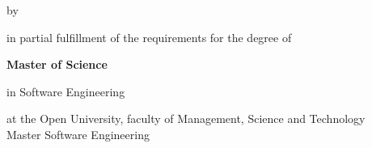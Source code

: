 \begin{titlepage}

    \begin{center}


        \vspace*{2\bigskipamount}

        {\makeatletter
            \titlestyle\color{red}\Huge\@title
            \makeatother}

        {\makeatletter
            \ifx\@subtitle\undefined\else
                \bigskip
                \titlefont\titleshape\LARGE\@subtitle
            \fi
            \makeatother}

        \bigskip
        \bigskip

        by

        \bigskip
        \bigskip

        {\makeatletter
            \titlefont\Large\bfseries\@author
            \makeatother}

        \vfill

        in partial fulfillment of the requirements for the degree of

        \bigskip
        \bigskip

        {\bfseries Master of Science}

        in Software Engineering

        \bigskip
        \bigskip

        at the Open University, faculty of Management, Science and Technology \\
        Master Software Engineering


\end{center}
\end{titlepage}
